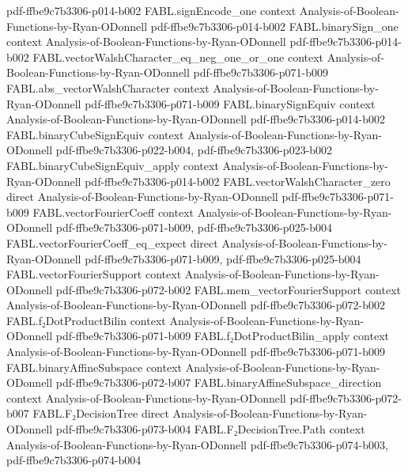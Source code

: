 \begin{theorem}
  {pdf-ffbe9c7b3306-p014-b002}
\proofstep
  {FABL.signEncode_one}
  {context}
  {Analysis-of-Boolean-Functions-by-Ryan-ODonnell}
  {pdf-ffbe9c7b3306-p014-b002}
\proofstep
  {FABL.binarySign_one}
  {context}
  {Analysis-of-Boolean-Functions-by-Ryan-ODonnell}
  {pdf-ffbe9c7b3306-p014-b002}
\proofstep
  {FABL.vectorWalshCharacter_eq_neg_one_or_one}
  {context}
  {Analysis-of-Boolean-Functions-by-Ryan-ODonnell}
  {pdf-ffbe9c7b3306-p071-b009}
\proofstep
  {FABL.abs_vectorWalshCharacter}
  {context}
  {Analysis-of-Boolean-Functions-by-Ryan-ODonnell}
  {pdf-ffbe9c7b3306-p071-b009}
\proofstep
  {FABL.binarySignEquiv}
  {context}
  {Analysis-of-Boolean-Functions-by-Ryan-ODonnell}
  {pdf-ffbe9c7b3306-p014-b002}
\proofstep
  {FABL.binaryCubeSignEquiv}
  {context}
  {Analysis-of-Boolean-Functions-by-Ryan-ODonnell}
  {pdf-ffbe9c7b3306-p022-b004,
    pdf-ffbe9c7b3306-p023-b002}
\proofstep
  {FABL.binaryCubeSignEquiv_apply}
  {context}
  {Analysis-of-Boolean-Functions-by-Ryan-ODonnell}
  {pdf-ffbe9c7b3306-p014-b002}
\proofstep
  {FABL.vectorWalshCharacter_zero}
  {direct}
  {Analysis-of-Boolean-Functions-by-Ryan-ODonnell}
  {pdf-ffbe9c7b3306-p071-b009}
\proofstep
  {FABL.vectorFourierCoeff}
  {context}
  {Analysis-of-Boolean-Functions-by-Ryan-ODonnell}
  {pdf-ffbe9c7b3306-p071-b009,
    pdf-ffbe9c7b3306-p025-b004}
\proofstep
  {FABL.vectorFourierCoeff_eq_expect}
  {direct}
  {Analysis-of-Boolean-Functions-by-Ryan-ODonnell}
  {pdf-ffbe9c7b3306-p071-b009,
    pdf-ffbe9c7b3306-p025-b004}
\proofstep
  {FABL.vectorFourierSupport}
  {context}
  {Analysis-of-Boolean-Functions-by-Ryan-ODonnell}
  {pdf-ffbe9c7b3306-p072-b002}
\proofstep
  {FABL.mem_vectorFourierSupport}
  {context}
  {Analysis-of-Boolean-Functions-by-Ryan-ODonnell}
  {pdf-ffbe9c7b3306-p072-b002}
\proofstep
  {FABL.f₂DotProductBilin}
  {context}
  {Analysis-of-Boolean-Functions-by-Ryan-ODonnell}
  {pdf-ffbe9c7b3306-p071-b009}
\proofstep
  {FABL.f₂DotProductBilin_apply}
  {context}
  {Analysis-of-Boolean-Functions-by-Ryan-ODonnell}
  {pdf-ffbe9c7b3306-p071-b009}
\proofstep
  {FABL.binaryAffineSubspace}
  {context}
  {Analysis-of-Boolean-Functions-by-Ryan-ODonnell}
  {pdf-ffbe9c7b3306-p072-b007}
\proofstep
  {FABL.binaryAffineSubspace_direction}
  {context}
  {Analysis-of-Boolean-Functions-by-Ryan-ODonnell}
  {pdf-ffbe9c7b3306-p072-b007}
\proofstep
  {FABL.F₂DecisionTree}
  {direct}
  {Analysis-of-Boolean-Functions-by-Ryan-ODonnell}
  {pdf-ffbe9c7b3306-p073-b004}
\proofstep
  {FABL.F₂DecisionTree.Path}
  {context}
  {Analysis-of-Boolean-Functions-by-Ryan-ODonnell}
  {pdf-ffbe9c7b3306-p074-b003,
    pdf-ffbe9c7b3306-p074-b004}

\end{theorem}

